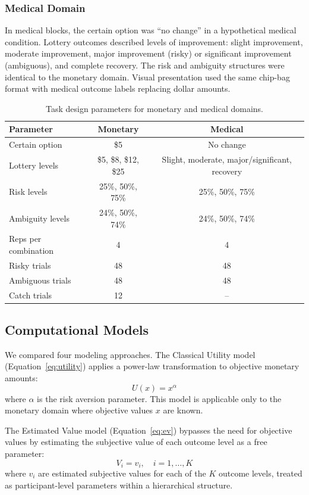 \documentclass[12pt]{article}
\begin{document}
\subsubsection{Medical Domain}

In medical blocks, the certain option was ``no change'' in a hypothetical medical condition. Lottery outcomes described levels of improvement: slight improvement, moderate improvement, major improvement (risky) or significant improvement (ambiguous), and complete recovery. The risk and ambiguity structures were identical to the monetary domain. Visual presentation used the same chip-bag format with medical outcome labels replacing dollar amounts.

\begin{table}[ht]
\centering
\caption{Task design parameters for monetary and medical domains.}
\label{tab:taskdesign}
\begin{tabular}{lcc}
\toprule
Parameter & Monetary & Medical \\
\midrule
Certain option & \$5 & No change \\
Lottery levels & \$5, \$8, \$12, \$25 & Slight, moderate, major/significant, recovery \\
Risk levels & 25\%, 50\%, 75\% & 25\%, 50\%, 75\% \\
Ambiguity levels & 24\%, 50\%, 74\% & 24\%, 50\%, 74\% \\
Reps per combination & 4 & 4 \\
Risky trials & 48 & 48 \\
Ambiguous trials & 48 & 48 \\
Catch trials & 12 & -- \\
\bottomrule
\end{tabular}
\end{table}

\subsection{Computational Models}

We compared four modeling approaches. The Classical Utility model (Equation~\ref{eq:utility}) applies a power-law transformation to objective monetary amounts:
\begin{equation}
U(x) = x^{\alpha}
\label{eq:utility}
\end{equation}
where $\alpha$ is the risk aversion parameter. This model is applicable only to the monetary domain where objective values $x$ are known.

The Estimated Value model (Equation~\ref{eq:ev}) bypasses the need for objective values by estimating the subjective value of each outcome level as a free parameter:
\begin{equation}
V_i = v_i, \quad i = 1, \ldots, K
\label{eq:ev}
\end{equation}
where $v_i$ are estimated subjective values for each of the $K$ outcome levels, treated as participant-level parameters within a hierarchical structure.
\end{document}
